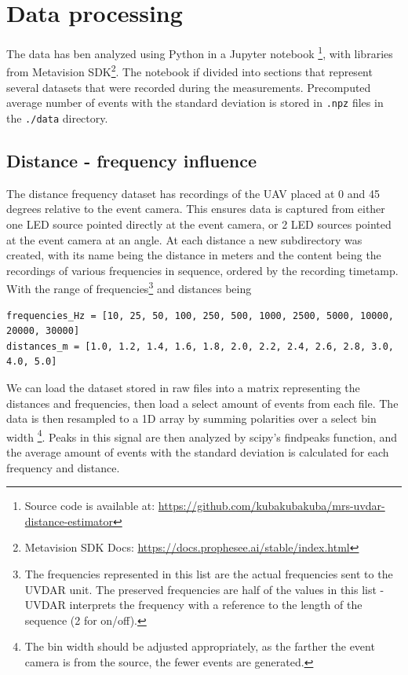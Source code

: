 
\chapter{Data processing\label{chap:data_processing}}

The data has ben analyzed using Python in a Jupyter notebook
\footnote{Source code is available at: \url{https://github.com/kubakubakuba/mrs-uvdar-distance-estimator}},
with libraries from Metavision SDK\footnote{Metavision SDK Docs: \url{https://docs.prophesee.ai/stable/index.html}}.
The notebook if divided into sections that represent several datasets that were recorded during the measurements.
Precomputed average number of events with the standard deviation is stored in \texttt{.npz} files in the \texttt{./data} directory.

\section{Distance - frequency influence}

The distance frequency dataset has recordings of the UAV placed at 0 and 45 degrees relative to the event camera. This ensures data is captured from either
one LED source pointed directly at the event camera, or 2 LED sources pointed at the event camera at an angle. At each distance a new subdirectory was
created, with its name being the distance in meters and the content being the recordings of various frequencies in sequence, ordered by the recording timetamp.
With the range of frequencies\footnote{The frequencies represented in this list are the actual frequencies sent to the UVDAR unit. The preserved frequencies
are half of the values in this list - UVDAR interprets the frequency with a reference to the length of the sequence (2 for on/off).} and distances being

\begin{lstlisting}
frequencies_Hz = [10, 25, 50, 100, 250, 500, 1000, 2500, 5000, 10000, 20000, 30000]
distances_m = [1.0, 1.2, 1.4, 1.6, 1.8, 2.0, 2.2, 2.4, 2.6, 2.8, 3.0, 4.0, 5.0]
\end{lstlisting}

We can load the dataset stored in raw files into a matrix representing the distances and frequencies, then load a select amount of events from each file.
The data is then resampled to a 1D array by summing polarities over a select bin width
\footnote{The bin width should be adjusted appropriately, as the farther the event camera is from the source, the fewer events are generated.}.
Peaks in this signal are then analyzed by scipy's findpeaks function,
and the average amount of events with the standard deviation is calculated for each frequency and distance.


